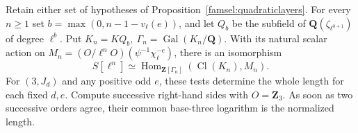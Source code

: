 \begin{proposition}\label{famsel:alltower}
Retain either set of hypotheses of Proposition~\ref{famsel:quadraticlayers}.
For every \(n\ge1\) set \(b=\max(0,n-1-v_\ell(e))\), and let
\(Q_b\) be the subfield of \(\mathbf Q(\zeta_{\ell^{b+1}})\) of
degree \(\ell^b\). Put \(K_n=KQ_b,\ \Gamma_n=\operatorname{Gal}(K_n/\mathbf Q)\).
With its natural scalar action on
\(M_n=(O/\ell^nO)(\psi^{-1}\chi_\ell^{-e})\), there is an isomorphism
\[
 S[\ell^n]\simeq
 \operatorname{Hom}_{\mathbf Z[\Gamma_n]}(\operatorname{Cl}(K_n),M_n).
\]
For \((3,J_d)\) and any positive odd \(e\), these tests determine the
whole length for each fixed \(d,e\). Compute successive right-hand
sides with \(O=\mathbf Z_3\). As soon as two successive orders agree,
their common base-three logarithm is the normalized length.
\end{proposition}
